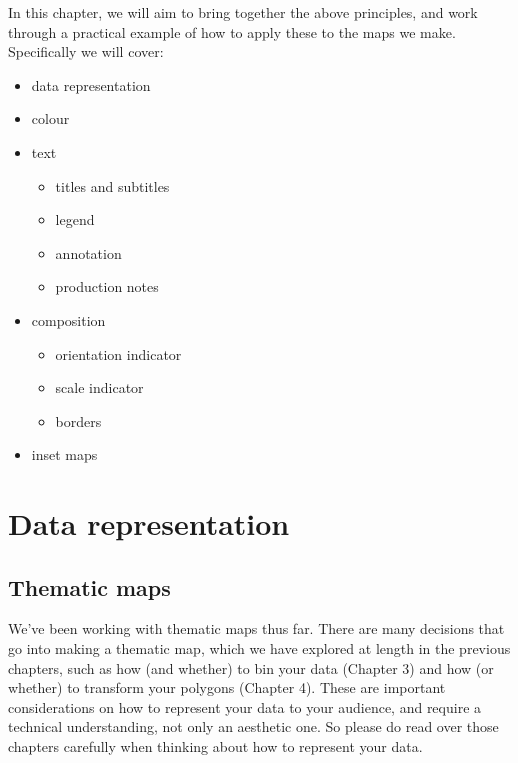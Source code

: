 \documentclass[
  krantz2]{krantz}
\providecommand{\tightlist}{%
  \setlength{\itemsep}{0pt}\setlength{\parskip}{0pt}}
\begin{document}
In this chapter, we will aim to bring together the above principles, and work through a practical example of how to apply these to the maps we make. Specifically we will cover:

\begin{itemize}
\tightlist
\item
  data representation
\item
  colour
\item
  text

  \begin{itemize}
  \tightlist
  \item
    titles and subtitles
  \item
    legend
  \item
    annotation
  \item
    production notes
  \end{itemize}
\item
  composition

  \begin{itemize}
  \tightlist
  \item
    orientation indicator
  \item
    scale indicator
  \item
    borders
  \end{itemize}
\item
  inset maps
\end{itemize}

\hypertarget{data-representation}{%
\section{Data representation}\label{data-representation}}

\hypertarget{thematic-maps}{%
\subsection{Thematic maps}\label{thematic-maps}}

We've been working with thematic maps thus far. There are many decisions that go into making a thematic map, which we have explored at length in the previous chapters, such as how (and whether) to bin your data (Chapter 3) and how (or whether) to transform your polygons (Chapter 4). These are important considerations on how to represent your data to your audience, and require a technical understanding, not only an aesthetic one. So please do read over those chapters carefully when thinking about how to represent your data.
\end{document}
